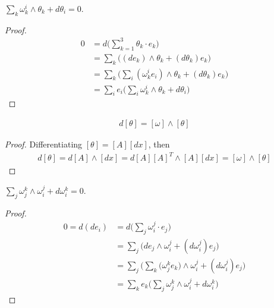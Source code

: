 \documentclass[10pt]{article}
\begin{document}
		\begin{theorem}
			$\sum\limits_k\omega_k^i\wedge\theta_k + d\theta_i = 0$.
		\end{theorem}
		\begin{proof}
			\begin{equation*}
				\begin{aligned}
					0 &= d\bigg( \sum\limits_{k=1}^3\theta_k\cdot e_k \bigg) \\
					&= \sum\limits_k\bigg((de_k)\wedge\theta_k + (d\theta_k)e_k\bigg) \\
					&= \sum\limits_k\bigg( \sum\limits_i(\omega_k^ie_i)\wedge\theta_k + (d\theta_k)e_k \bigg) \\
					&= \sum\limits_ie_i\bigg( \sum\limits_i\omega_k^i\wedge\theta_k + d\theta_i \bigg)
				\end{aligned}
			\end{equation*}
		\end{proof}
	
		\begin{proposition}
			\begin{equation*}
				\begin{aligned}
					d[\theta] = [\omega]\wedge[\theta]
				\end{aligned}
			\end{equation*}
		\end{proposition}
            \begin{proof}
			Differentiating $[\theta] = [A][dx]$, then
			\begin{equation*}
				\begin{aligned}
					d[\theta] = d[A]\wedge [dx] = d[A][A]^T \wedge [A][dx] = [\omega]\wedge[\theta]
				\end{aligned}
			\end{equation*}
            \end{proof}
	
		\begin{theorem}
			$\sum\limits_j\omega_j^k\wedge\omega_i^j + d\omega_i^k = 0$.
		\end{theorem}
		\begin{proof}
			\begin{equation*}
				\begin{aligned}
					0 = d(de_i) &= d\bigg(\sum\limits_j\omega_i^j\cdot e_j\bigg) \\
					&= \sum\limits_j\bigg( de_j\wedge\omega_i^j + (d\omega_i^j)e_j \bigg) \\
					&= \sum\limits_j\bigg(\sum\limits_k\big( \omega_j^ke_k \big)\wedge\omega_i^j + (d\omega_i^j)e_j\bigg) \\
					&= \sum\limits_ke_k\bigg( \sum\limits_j\omega_j^k\wedge\omega_i^j + d\omega_i^k \bigg)
				\end{aligned}
			\end{equation*}
		\end{proof}
	
\end{document}
